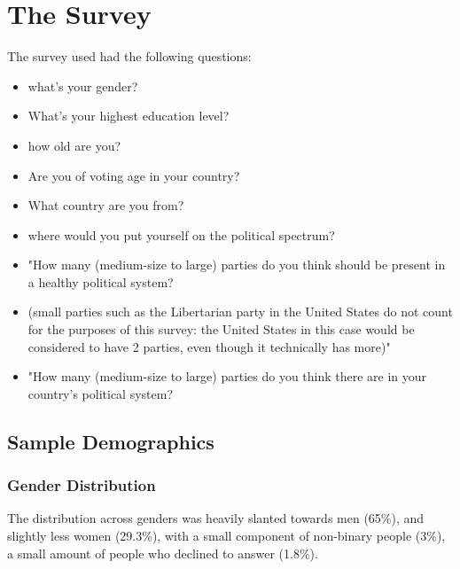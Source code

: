 \documentclass{article}
\begin{document}
\section{The Survey}
The survey used had the following questions:\\
\begin{itemize}
  \item what's your gender?\\
  \item What's your highest education level?\\
  \item how old are you?\\
  \item Are you of voting age in your country?\\
  \item What country are you from?\\
  \item where would you put yourself on the political spectrum?\\
  \item "How many (medium-size to large) parties do you think should be present in a healthy political system?\\
  \item (small parties such as the Libertarian party in the United States do not count for the purposes of this survey: the United States in this case would be considered to have 2 parties, even though it technically has more)"\\ \item 
"How many (medium-size to large) parties do you think there are in your country's political system?
\end{itemize}

\subsection{Sample Demographics} %
\label{sub:Demographic}

\subsubsection{Gender Distribution} %
\label{subsub:Gender Distribution}
The distribution across genders was heavily slanted towards men (65\%), and slightly less women (29.3\%), with a small component of non-binary people (3\%), a small amount of people who declined to answer (1.8\%).
\end{document}
